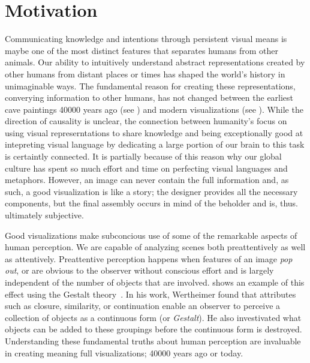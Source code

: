 \chapter{Motivation} \label{cha:motivation}
Communicating knowledge and intentions through persistent visual means is maybe one of the most distinct features that separates humans from other animals.  Our ability to intuitively understand abstract representations created by other humans from distant places or times has shaped the world's history in unimaginable ways.  The fundamental reason for creating these representations, converying information to other humans, has not changed between the earliest cave paintings 40000 years ago (see ) and modern visualizations (see ).  While the direction of causality is unclear, the connection between humanity's focus on using visual represerntations to share knowledge and being exceptionally good at intepreting visual language by dedicating a large portion of our brain to this task is certaintly connected.  It is partially because of this reason why our global culture has spent so much effort and time on perfecting visual languages and metaphors.  However, an image can never contain the full information and, as such, a good visualization is like a story;  the designer provides all the necessary components, but the final assembly occurs in mind of the beholder and is, thus. ultimately subjective.

Good visualizations make subconcious use of some of the remarkable aspects of human perception.  We are capable of analyzing scenes both preattentively as well as attentively.  Preattentive perception happens when features of an image \emph{pop out}, or are obvious to the observer without conscious effort and is largely independent of the number of objects that are involved.   shows an example of this effect using the Gestalt theory~\cite{wertheimer1922untersuchungen}.  In his work, Wertheimer found that attributes such as closure, similarity, or continuation enable an observer to perceive a collection of objects as a continuous form (or \emph{Gestalt}).  He also investivated what objects can be added to these groupings before the continuous form is destroyed.  Understanding these fundamental truths about human perception are invaluable in creating meaning full visualizations;  40000 years ago or today.

